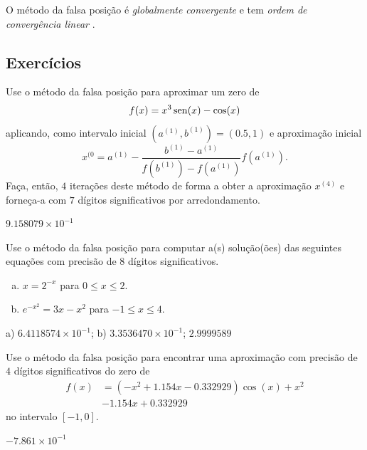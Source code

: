 \begin{obs}
  O método da falsa posição é \emph{globalmente convergente} e tem \emph{ordem de convergência linear} \cite[Seção 8.3]{Ralston2001a}.
\end{obs}

\subsection{Exercícios}

\begin{exer}
  Use o método da falsa posição para aproximar um zero de
  \begin{equation}
    f(x) = x^3\operatorname{sen}(x)-\cos(x)
  \end{equation}
  aplicando, como intervalo inicial $(a^{(1)}, b^{(1)}) = (0.5, 1)$ e aproximação inicial
  \begin{equation}
    x^{(0} = a^{(1)} - \frac{b^{(1)}-a^{(1)}}{f(b^{(1)})-f(a^{(1)})}f(a^{(1)}).
  \end{equation}
  Faça, então, $4$ iterações deste método de forma a obter a aproximação $x^{(4)}$ e forneça-a com $7$ dígitos significativos por arredondamento.
\end{exer}
\begin{resp}
  $9.158079\times 10^{-1}$
\end{resp}

\begin{exer}
  Use o método da falsa posição para computar a(s) solução(ões) das seguintes equações com precisão de 8 dígitos significativos.
  \begin{enumerate}[a)]
  \item $x = 2^{-x}$ para $0\leq x \leq 2$.
  \item $e^{-x^2} = 3x - x^2$ para $-1\leq x\leq 4$.
  \end{enumerate}
\end{exer}
\begin{resp}
  a) $6.4118574\times 10^{-1}$; b) $3.3536470\times 10^{-1}$; $2.9999589$
\end{resp}

\begin{exer}
  Use o método da falsa posição para encontrar uma aproximação com precisão de $4$ dígitos significativos do zero de 
  \begin{equation}
    \begin{aligned}
      f(x) &= (-x^2+1.154x-0.332929)\cos(x) + x^2 \\
           &- 1.154x + 0.332929
    \end{aligned}
\end{equation}
  no intervalo $[-1, 0]$.
\end{exer}
\begin{resp}
  $-7.861\times 10^{-1}$
\end{resp}

